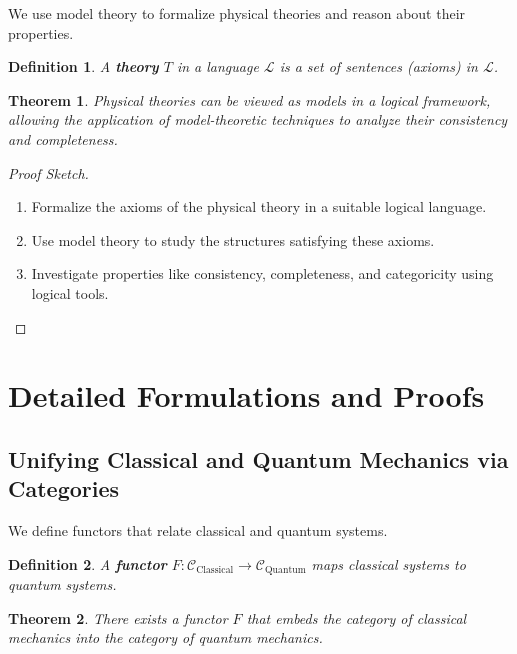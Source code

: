 \documentclass[12pt]{article}
\newtheorem{definition}{Definition}[section]
\newtheorem{theorem}{Theorem}[section]
\begin{document}
We use model theory to formalize physical theories and reason about their properties.

\begin{definition}
A \textbf{theory} $T$ in a language $\mathcal{L}$ is a set of sentences (axioms) in $\mathcal{L}$.
\end{definition}

\begin{theorem}
Physical theories can be viewed as models in a logical framework, allowing the application of model-theoretic techniques to analyze their consistency and completeness.
\end{theorem}

\begin{proof}[Proof Sketch]
\leavevmode
\begin{enumerate}[label=\arabic*.]
    \item Formalize the axioms of the physical theory in a suitable logical language.
    \item Use model theory to study the structures satisfying these axioms.
    \item Investigate properties like consistency, completeness, and categoricity using logical tools.
\end{enumerate}
\end{proof}

\section{Detailed Formulations and Proofs}

\subsection{Unifying Classical and Quantum Mechanics via Categories}

We define functors that relate classical and quantum systems.

\begin{definition}
A \textbf{functor} $F: \mathcal{C}_{\text{Classical}} \rightarrow \mathcal{C}_{\text{Quantum}}$ maps classical systems to quantum systems.
\end{definition}

\begin{theorem}
There exists a functor $F$ that embeds the category of classical mechanics into the category of quantum mechanics.
\end{theorem}
\end{document}
